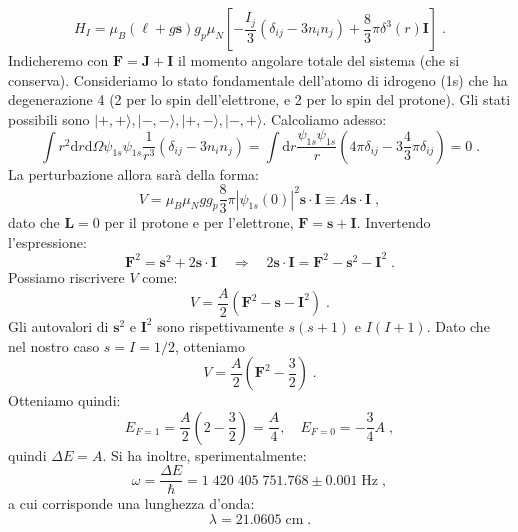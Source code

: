 \documentclass[12pt,a4paper]{report}
\theoremstyle{definition}
\numberwithin{equation}{section}
\newcommand{\diff}[1][]{\mathrm{d}#1}
\newcommand{\ket}{\rangle}
\begin{document}
\begin{equation}
H_I=\mu_B(\boldsymbol{\ell}+g\mathbf{s})g_p\mu_N\left[-\frac{I_j}{3}(\delta_{ij}-3n_in_j)+\frac{8}{3}\pi \delta^3(r)\mathbf{I}\right]\;.
\end{equation}
Indicheremo con $\mathbf{F}=\mathbf{J}+\mathbf{I}$ il momento angolare totale del sistema (che si conserva). Consideriamo lo stato fondamentale dell'atomo di idrogeno (1s) che ha degenerazione 4 (2 per lo spin dell'elettrone, e 2 per lo spin del protone). Gli stati possibili sono $|+,+\ket,|-,-\ket,|+,-\ket,|-,+\ket$. Calcoliamo adesso:
$$
\int r^2\diff{r}\diff{\Omega}\psi_{1s}\psi_{1s}\frac{1}{r^3}(\delta_{ij}-3n_in_j)=\int \diff{r}\frac{\psi_{1s}\psi_{1s}}{r}\left(4\pi\delta_{ij}-3\frac{4}{3}\pi\delta_{ij}\right)=0\;.
$$
La perturbazione allora sarà della forma:
\begin{equation}
V=\mu_B\mu_Ngg_p\frac{8}{3}\pi|\psi_{1s}(0)|^2\mathbf{s}\cdot\mathbf{I}\equiv A \mathbf{s}\cdot\mathbf{I}\;,
\end{equation}
dato che $\mathbf{L}=0$ per il protone e per l'elettrone, $\mathbf{F}=\mathbf{s}+\mathbf{I}$. Invertendo l'espressione:
\begin{equation}
\mathbf{F}^2=\mathbf{s}^2+2\mathbf{s}\cdot\mathbf{I}\quad \Longrightarrow\quad 2\mathbf{s}\cdot\mathbf{I}=\mathbf{F}^2-\mathbf{s}^2-\mathbf{I}^2\;.
\end{equation}
Possiamo riscrivere $V$ come:
$$
V=\frac{A}{2}(\mathbf{F}^2-\mathbf{s}-\mathbf{I}^2)\;.
$$
Gli autovalori di $\mathbf{s}^2$ e $\mathbf{I}^2$ sono rispettivamente $s(s+1)$ e $I(I+1)$. Dato che nel nostro caso $s=I=1/2$, otteniamo
\begin{equation}
V=\frac{A}{2}\left(\mathbf{F}^2-\frac{3}{2}\right)\;.
\end{equation}
Otteniamo quindi:
\begin{equation}
E_{F=1}=\frac{A}{2}\left(2-\frac{3}{2}\right)=\frac{A}{4}, \quad E_{F=0}=-\frac{3}{4}A\;,
\end{equation}
quindi $\Delta E=A$. Si ha inoltre, sperimentalmente:
\begin{equation}
\omega=\frac{\Delta E}{\hbar}=1\;420\;405\;751.768\pm 0.001\;\mbox{Hz}\;,
\end{equation}
a cui corrisponde una lunghezza d'onda:
\begin{equation}
\lambda=21.0605\;\mbox{cm}\;.
\end{equation}
\end{document}
